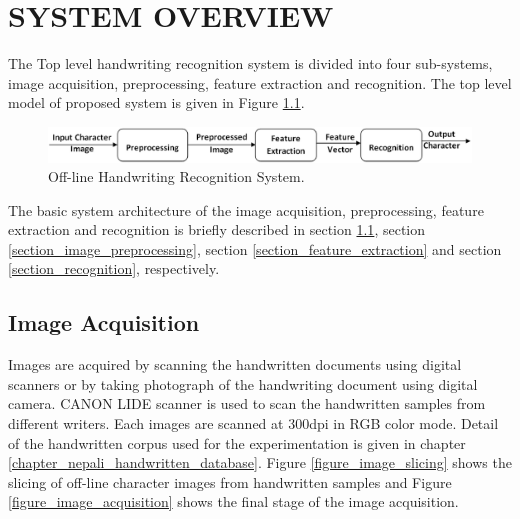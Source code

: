\chapter{SYSTEM OVERVIEW}\label{chapter_system_overview}
The Top level handwriting recognition system is divided into four sub-systems, image acquisition, preprocessing, feature extraction and recognition. The top level model of proposed system is given in Figure \ref{figure_system_overview}.
\begin{figure}[h]
\centering
\includegraphics[width=\linewidth]{figures/system_overview/system_overview.eps}
\caption{Off-line Handwriting Recognition System.}
\label{figure_system_overview}
\end{figure}

The basic system architecture of the image acquisition, preprocessing, feature extraction and recognition is briefly described in section \ref{section_image_acquisition}, section \ref{section_image_preprocessing}, section \ref{section_feature_extraction} and section \ref{section_recognition}, respectively.

\section{Image Acquisition} \label{section_image_acquisition}
Images are acquired by scanning the handwritten documents using digital scanners or by taking photograph of the handwriting document using digital camera. CANON LIDE scanner is used to scan the handwritten samples from different writers. Each images are scanned at 300dpi in RGB color mode. Detail of the handwritten corpus used for the experimentation is given in chapter \ref{chapter_nepali_handwritten_database}. Figure \ref{figure_image_slicing} shows the slicing of off-line character images from handwritten samples and Figure \ref{figure_image_acquisition} shows the final stage of the image acquisition.

